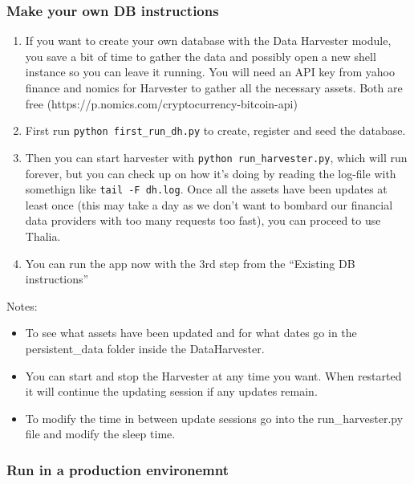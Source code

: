 \documentclass[main.tex]{subfiles}
\begin{document}
\subsubsection{Make your own DB
instructions}\label{make-your-own-db-instructions}

\begin{enumerate}
\def\labelenumi{\arabic{enumi}.}

\item
  If you want to create your own database with the Data Harvester
  module, you save a bit of time to gather the data and possibly open a
  new shell instance so you can leave it running. You will need an API
  key from yahoo finance and nomics for Harvester to gather all the
  necessary assets. Both are free
  (https://p.nomics.com/cryptocurrency-bitcoin-api)
\item
  First run \texttt{python\ first\_run\_dh.py} to create, register and
  seed the database.
\item
  Then you can start harvester with \texttt{python\ run\_harvester.py},
  which will run forever, but you can check up on how it's doing by
  reading the log-file with somethign like \texttt{tail\ -F\ dh.log}.
  Once all the assets have been updates at least once (this may take a
  day as we don't want to bombard our financial data providers with too
  many requests too fast), you can proceed to use Thalia.
\item
  You can run the app now with the 3rd step from the ``Existing DB
  instructions''
\end{enumerate}

Notes:

\begin{itemize}

\item
  To see what assets have been updated and for what dates go in the
  persistent\_data folder inside the DataHarvester.
\item
  You can start and stop the Harvester at any time you want. When
  restarted it will continue the updating session if any updates remain.
\item
  To modify the time in between update sessions go into the
  run\_harvester.py file and modify the sleep time.
\end{itemize}

\subsubsection{Run in a production
environemnt}\label{run-in-a-production-environemnt}
\end{document}
